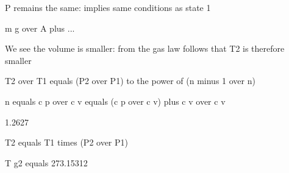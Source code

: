 P remains the same: implies same conditions as state 1

m g over A plus ...

We see the volume is smaller: from the gas law follows that T2 is therefore smaller

T2 over T1 equals (P2 over P1) to the power of (n minus 1 over n)

n equals c p over c v equals (c p over c v) plus c v over c v

1.2627

T2 equals T1 times (P2 over P1)

T g2 equals 273.15312